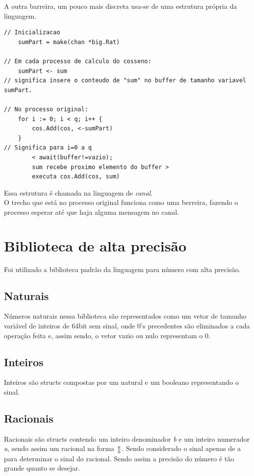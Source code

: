 \documentclass[paper=a4, fontsize=11pt]{scrartcl}
\numberwithin{equation}{section}		%
\numberwithin{figure}{section}			%
\numberwithin{table}{section}				%
\begin{document}
A outra barreira, um pouco mais discreta usa-se de uma estrutura própria da linguagem.
\begin{lstlisting}
// Inicializacao
	sumPart = make(chan *big.Rat)
	
// Em cada processo de calculo do cosseno:
	sumPart <- sum
// significa insere o conteudo de "sum" no buffer de tamanho variavel sumPart.

// No processo original:
	for i := 0; i < q; i++ {
		cos.Add(cos, <-sumPart)
	}
// Significa para i=0 a q
		< await(buffer!=vazio);
		sum recebe proximo elemento do buffer >
		executa cos.Add(cos, sum)
\end{lstlisting}
Essa estrutura é chamada na linguagem de \textit{canal}.\\
O trecho que está no processo original funciona como uma berreira, fazendo o processo esperar até que haja alguma mensagem no canal.

\section{Biblioteca de alta precisão}
Foi utilizado a biblioteca padrão da linguagem para número com alta precisão.

\subsection{Naturais}
Números naturais nessa biblioteca são representados como um vetor de tamanho variável de inteiros de 64bit sem sinal, onde 0's precedentes são eliminados a cada operação feita e, assim sendo, o vetor vazio ou nulo representam o 0.\\

\subsection{Inteiros}
Inteiros são structs compostas por um natural e um booleano representando o sinal.\\

\subsection{Racionais}
Racionais são structs contendo um inteiro denominador \textit{b} e um inteiro numerador \textit{a}, sendo assim um racional na forma ${a}\over{b}$. Sendo considerado o sinal apenas de a para determinar o sinal do racional. Sendo assim a precisão do número é tão grande quanto se desejar.\\
\end{document}
